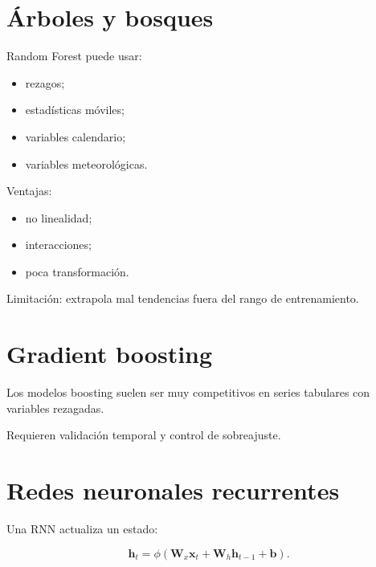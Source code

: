 \documentclass[
  spanish,
  10.5pt,
  letterpaper,
  DIV=11,
  numbers=noendperiod,
  oneside,
  open=any]{scrreprt}
\providecommand{\tightlist}{%
  \setlength{\itemsep}{0pt}\setlength{\parskip}{0pt}}
\theoremstyle{definition}
\theoremstyle{definition}
\theoremstyle{plain}
\theoremstyle{remark}
\begin{document}
\section*{Árboles y bosques}\label{uxe1rboles-y-bosques}


Random Forest puede usar:

\begin{itemize}
\tightlist
\item
  rezagos;
\item
  estadísticas móviles;
\item
  variables calendario;
\item
  variables meteorológicas.
\end{itemize}

Ventajas:

\begin{itemize}
\tightlist
\item
  no linealidad;
\item
  interacciones;
\item
  poca transformación.
\end{itemize}

Limitación: extrapola mal tendencias fuera del rango de entrenamiento.

\section*{Gradient boosting}\label{gradient-boosting}


Los modelos boosting suelen ser muy competitivos en series tabulares con
variables rezagadas.

Requieren validación temporal y control de sobreajuste.

\section*{Redes neuronales
recurrentes}\label{redes-neuronales-recurrentes}


Una RNN actualiza un estado:

\[
\mathbf{h}_t
=
\phi
\left(
\mathbf{W}_x\mathbf{x}_t
+
\mathbf{W}_h\mathbf{h}_{t-1}
+
\mathbf{b}
\right).
\]
\end{document}
